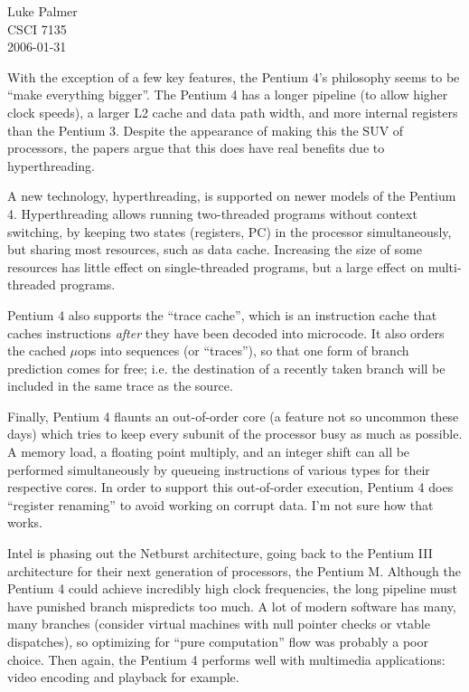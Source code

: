 \documentclass[12pt]{article}
\begin{document}
\noindent
Luke Palmer \\
CSCI 7135 \\
2006-01-31

With the exception of a few key features, the Pentium 4's philosophy
seems to be ``make everything bigger''.  The Pentium 4 has a longer
pipeline (to allow higher clock speeds), a larger L2 cache and data path
width, and more internal registers than the Pentium 3.  Despite the
appearance of making this the SUV of processors, the papers argue that
this does have real benefits due to hyperthreading.  

A new technology, hyperthreading, is supported on newer models of the
Pentium 4.  Hyperthreading allows running two-threaded programs without
context switching, by keeping two states (registers, PC) in the
processor simultaneously, but sharing most resources, such as data
cache.  Increasing the size of some resources has little effect on
single-threaded programs, but a large effect on multi-threaded programs.

Pentium 4 also supports the ``trace cache'', which is an instruction
cache that caches instructions \textit{after} they have been decoded
into microcode.  It also orders the cached $\mu$ops into sequences (or
``traces''), so that one form of branch prediction comes for free; i.e.
the destination of a recently taken branch will be included in the same
trace as the source.

Finally, Pentium 4 flaunts an out-of-order core (a feature not so
uncommon these days) which tries to keep every subunit of the processor
busy as much as possible.  A memory load, a floating point multiply, and
an integer shift can all be performed simultaneously by queueing
instructions of various types for their respective cores.  In order to
support this out-of-order execution, Pentium 4 does ``register
renaming'' to avoid working on corrupt data.  I'm not sure how that
works.

Intel is phasing out the Netburst architecture, going back to the
Pentium III architecture for their next generation of processors, the
Pentium M.  Although the Pentium 4 could achieve incredibly high clock
frequencies, the long pipeline must have punished branch mispredicts too
much.  A lot of modern software has many, many branches (consider
virtual machines with null pointer checks or vtable dispatches), so
optimizing for ``pure computation'' flow was probably a poor choice.
Then again, the Pentium 4 performs well with multimedia applications:
video encoding and playback for example.
\end{document}
